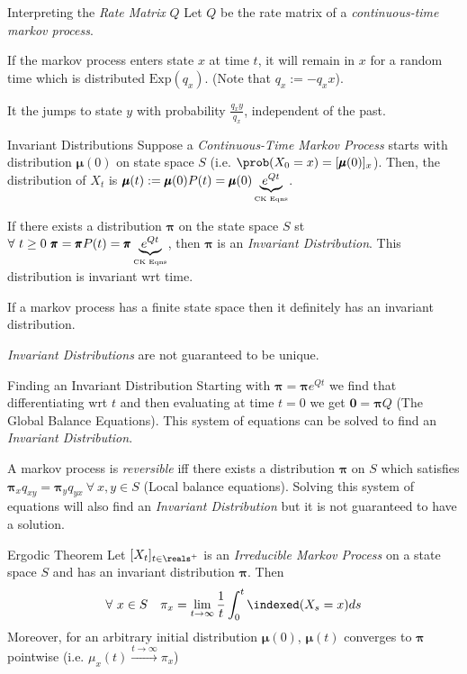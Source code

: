 \documentclass[11pt,a4paper]{article}
\begin{document}
\begin{proposition}{Interpreting the \textit{Rate Matrix} $Q$}
  Let $Q$ be the rate matrix of a \textit{continuous-time markov process}.
  \par If the markov process enters state $x$ at time $t$, it will remain in $x$ for a random time which is distributed $\text{Exp}(q_x)$. (Note that $q_x:=-q_xx$).
  \par It the jumps to state $y$ with probability   $\frac{q_xy}{q_x}$, independent of the past.
\end{proposition}

\begin{definition}{Invariant Distributions}
  Suppose a \textit{Continuous-Time Markov Process} starts with distribution $\pmb\mu(0)$ on state space $S$ (i.e. $\prob(X_0=x)=[\pmb\mu(0)]_x$). Then, the distribution of $X_t$ is $\pmb\mu(t):=\pmb\mu(0)P(t)=\pmb\mu(0)\underbrace{e^{Qt}}_\text{\tiny CK Eqns}$.
  \par If there exists a distribution $\pmb\pi$ on the state space $S$ st $\forall\ t\geq0\ \pmb\pi=\pmb\pi P(t)=\pmb\pi \underbrace{e^{Qt}}_\text{\tiny CK Eqns}$, then $\pmb\pi$ is an \textit{Invariant Distribution}. This distribution is invariant wrt time.
  \par If a markov process has a finite state space then it definitely has an invariant distribution.
  \par \textit{Invariant Distributions} are not guaranteed to be unique.
\end{definition}

\begin{proposition}{Finding an Invariant Distribution}
  Starting with $\pmb\pi=\pmb\pi e^{Qt}$ we find that differentiating wrt $t$ and then evaluating at time $t=0$ we get $\pmb0=\pmb\pi Q$ (The Global Balance Equations). This system of equations can be solved to find an \textit{Invariant Distribution}.
  \par A markov process is \textit{reversible} iff there exists a distribution $\pmb\pi$ on $S$ which satisfies $\pmb\pi_xq_{xy}=\pmb\pi_yq_{yx}\ \forall\ x,y\in S$ (Local balance equations). Solving this system of equations will also find an \textit{Invariant Distribution} but it is not guaranteed to have a solution.
\end{proposition}

\begin{theorem}{Ergodic Theorem}
  Let $[X_t]_{t\in\reals^+}$ is an \textit{Irreducible Markov Process} on a state space $S$ and has an invariant distribution $\pmb\pi$. Then
  \[ \forall\ x\in S\quad\pi_x=\lim_{t\to\infty}\frac1t\int_0^t\indexed(X_s=x)ds \]
  Moreover, for an arbitrary initial distribution $\pmb\mu(0)$, $\pmb\mu(t)$ converges to $\pmb\pi$ pointwise (i.e. $\mu_x(t)\overset{t\to\infty}\longrightarrow\pi_x$)
\end{theorem}
\end{document}
